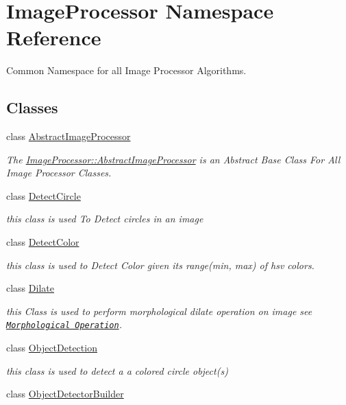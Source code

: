 \hypertarget{namespace_image_processor}{}\section{Image\+Processor Namespace Reference}
\label{namespace_image_processor}


Common Namespace for all Image Processor Algorithms.  


\subsection*{Classes}
\begin{DoxyCompactItemize}
\item 
class \hyperlink{class_image_processor_1_1_abstract_image_processor}{Abstract\+Image\+Processor}
\begin{DoxyCompactList}\small\item\em The \hyperlink{class_image_processor_1_1_abstract_image_processor}{Image\+Processor\+::\+Abstract\+Image\+Processor} is an Abstract Base Class For All Image Processor Classes. \end{DoxyCompactList}\item 
class \hyperlink{class_image_processor_1_1_detect_circle}{Detect\+Circle}
\begin{DoxyCompactList}\small\item\em this class is used To Detect circles in an image \end{DoxyCompactList}\item 
class \hyperlink{class_image_processor_1_1_detect_color}{Detect\+Color}
\begin{DoxyCompactList}\small\item\em this class is used to Detect Color given it\textquotesingle{}s range(min, max) of hsv colors. \end{DoxyCompactList}\item 
class \hyperlink{class_image_processor_1_1_dilate}{Dilate}
\begin{DoxyCompactList}\small\item\em this Class is used to perform morphological dilate operation on image see \href{https://docs.opencv.org/trunk/d9/d61/tutorial_py_morphological_ops.html}{\tt Morphological Operation}. \end{DoxyCompactList}\item 
class \hyperlink{class_image_processor_1_1_object_detection}{Object\+Detection}
\begin{DoxyCompactList}\small\item\em this class is used to detect a a colored circle object(s) \end{DoxyCompactList}\item 
class \hyperlink{class_image_processor_1_1_object_detector_builder}{Object\+Detector\+Builder}
\end{DoxyCompactItemize}
